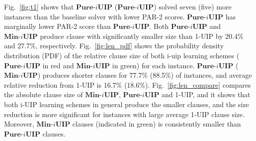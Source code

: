\documentclass[runningheads]{llncs}
\newcommand{\IUIPPURE}{\textbf{Pure-$i$UIP}}
\newcommand{\IUIPMIN}{\textbf{Min-$i$UIP}}
\begin{document}
Fig.~\ref{fig:t1} shows that $\IUIPPURE$ ($\IUIPPURE$) solved seven
(five) more instances than the baseline solver with lower PAR-2
scores. $\IUIPPURE$ has marginally lower PAR-2 score than
$\IUIPPURE$. Both $\IUIPPURE$ and $\IUIPMIN$ produce clause with
significantly smaller size than 1-UIP by 20.4\% and 27.7\%,
respectively. Fig.~\ref{fig:len_pdf} shows the probability density
distribution (PDF) of the relative clause size of both i-uip learning
schemes ($\IUIPPURE$ in red and $\IUIPMIN$ in green) for each
instance. $\IUIPPURE$ ($\IUIPMIN$) produces shorter clauses for 77.7\%
(88.5\%) of instances, and average relative reduction from 1-UIP is
16.7\% (18.6\%). Fig.~\ref{fig:len_compare} compares the absolute
clause size of $\IUIPMIN$, $\IUIPPURE$ and 1-UIP, and it shows that
both i-UIP learning schemes in general produce the smaller clauses,
and the size reduction is more significant for instances with large
average 1-UIP clause size. Moreover, $\IUIPMIN$ clauses (indicated in
green) is consistently smaller than $\IUIPPURE$ clauses.
\end{document}
